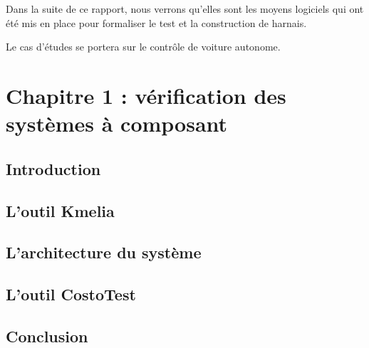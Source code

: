 \documentclass[
10pt, %
a4paper, %
oneside, %
headinclude,footinclude, %
BCOR5mm, %
]{report}
\begin{document}
	Dans la suite de ce rapport, nous verrons qu’elles sont les moyens logiciels qui ont été mis en place pour formaliser le test et la construction de harnais.


	Le cas d'études se portera sur le contrôle de voiture autonome.



								
								  
	\newpage
	\chapter{Chapitre 1 : vérification des systèmes à composant}
	\minitoc
	\section{Introduction}
	\lipsum[5] %
	\section{L'outil Kmelia}
	\lipsum[5] %
	\section{L'architecture du système}
	\lipsum[5] %
	\section{L'outil CostoTest}
	\lipsum[5] %
	\section{Conclusion}
	\lipsum[10]		
								  
														
														
\end{document}

